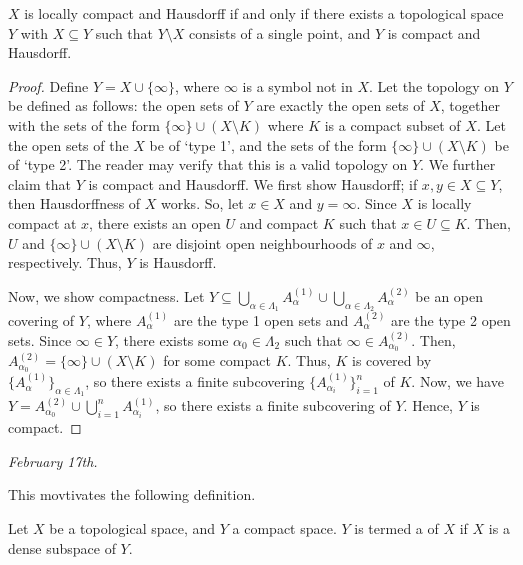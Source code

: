 \begin{theorem}
    $X$ is locally compact and Hausdorff if and only if there exists a topological space $Y$ with $X \subseteq Y$ such that $Y \setminus X$ consists of a single point, and $Y$ is compact and Hausdorff.
\end{theorem}
\begin{proof}
    Define $Y = X \cup \{\infty\}$, where $\infty$ is a symbol not in $X$. Let the topology on $Y$ be defined as follows: the open sets of $Y$ are exactly the open sets of $X$, together with the sets of the form $\{\infty\} \cup (X \setminus K)$ where $K$ is a compact subset of $X$. Let the open sets of the $X$ be of `type 1', and the sets of the form $\{\infty\} \cup (X \setminus K)$ be of `type 2'. The reader may verify that this is a valid topology on $Y$. We further claim that $Y$ is compact and Hausdorff. We first show Hausdorff; if $x,y \in X \subseteq Y$, then Hausdorffness of $X$ works. So, let $x \in X$ and $y = \infty$. Since $X$ is locally compact at $x$, there exists an open $U$ and compact $K$ such that $x \in U \subseteq K$. Then, $U$ and $\{\infty\} \cup (X \setminus K)$ are disjoint open neighbourhoods of $x$ and $\infty$, respectively. Thus, $Y$ is Hausdorff.

    Now, we show compactness. Let $Y \subseteq \bigcup_{\alpha \in \Lambda_{1}} A_{\alpha}^{(1)} \cup \bigcup_{\alpha \in \Lambda_{2}} A_{\alpha}^{(2)}$ be an open covering of $Y$, where $A_{\alpha}^{(1)}$ are the type 1 open sets and $A_{\alpha}^{(2)}$ are the type 2 open sets. Since $\infty \in Y$, there exists some $\alpha_{0} \in \Lambda_{2}$ such that $\infty \in A_{\alpha_{0}}^{(2)}$. Then, $A_{\alpha_{0}}^{(2)} = \{\infty\} \cup (X \setminus K)$ for some compact $K$. Thus, $K$ is covered by $\{A_{\alpha}^{(1)}\}_{\alpha \in \Lambda_{1}}$, so there exists a finite subcovering $\{A_{\alpha_{i}}^{(1)}\}_{i=1}^{n}$ of $K$. Now, we have $Y = A_{\alpha_{0}}^{(2)} \cup \bigcup_{i=1}^{n} A_{\alpha_{i}}^{(1)}$, so there exists a finite subcovering of $Y$. Hence, $Y$ is compact.
\end{proof}

\noindent \textit{February 17th.}

This movtivates the following definition.

\begin{definition}
    Let $X$ be a topological space, and $Y$ a compact space. $Y$ is termed a  of $X$ if $X$ is a dense subspace of $Y$.
\end{definition}


